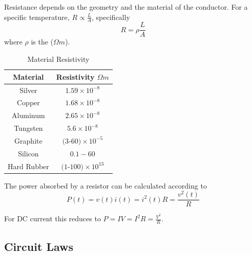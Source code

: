 \documentclass[12pt, a4paper, oneside, openright, titlepage]{book}
\begin{document}
Resistance depends on the geometry and the material of the conductor. For a specific temperature, $R \propto \frac{L}{A}$, specifically \begin{equation*}
    R = \rho\frac{L}{A}
\end{equation*}
where $\rho$ is the  ($\Omega m$).

\begin{table}[H]
    \centering
    \caption{Material Resistivity}
    \begin{tabular}{|cc|}
        \hline 
        Material & Resistivity $\Omega m$ \\ \hline
        Silver & $1.59\times 10^{-8}$ \\ \hline
        Copper & $ 1.68\times 10^{-8}$ \\ \hline 
        Aluminum & $2.65\times 10^{-8}$ \\ \hline
        Tungsten & $5.6\times 10^{-8}$ \\ \hline
        Graphite & $(3$-$60)\times 10^{-5}$ \\\hline
        Silicon & $0.1-60$ \\ \hline
        Hard Rubber & $(1$-$100)\times 10^{13}$ \\ \hline
    \end{tabular}
\end{table}

\begin{defn}
    The power absorbed by a resistor can be calculated according to \begin{equation*}
        P(t) = v(t)i(t) = i^2(t)R = \frac{v^2(t)}{R}
    \end{equation*}
\end{defn}
For DC current this reduces to $P = IV = I^2R = \frac{V^2}{R}$.

\subsection{Circuit Laws}
\end{document}
